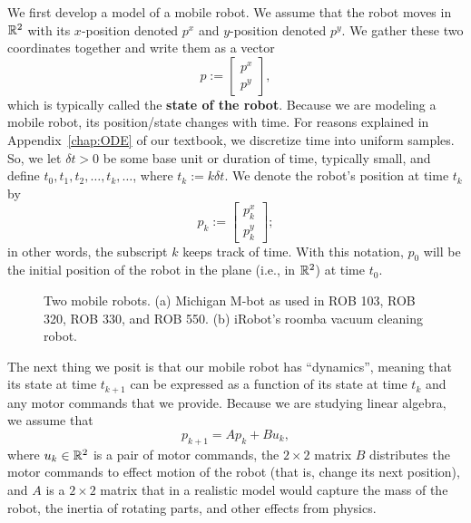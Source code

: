 We first develop a model of a mobile robot. We assume that the robot moves in $\mathbb R^2$ with its $x$-position denoted $p^x$ and $y$-position denoted $p^y$. We gather these two coordinates together and write them as a vector
\begin{equation}
   p:= \begin{bmatrix} p^x \\ p^y \end{bmatrix},
\end{equation}
which is typically called the \textbf{state of the robot}. 
Because we are modeling a mobile robot, its position/state changes with time. For reasons explained in Appendix~\ref{chap:ODE} of our textbook, we discretize time into uniform samples. So, we let $\delta t >0$ be some base unit or duration of time, typically small, and define $t_0, t_1, t_2, \ldots, t_k, \ldots$, where $t_k:=k \delta t$. We denote the robot's position at time $t_k$ by
\begin{equation}
\label{eq:stateVariablesMobileRobot}
   p_k:= \begin{bmatrix} p^x_k \\ p^y_k \end{bmatrix};
\end{equation}
in other words, the subscript $k$ keeps track of time. With this notation, $p_0$ will be the initial position of the robot in the plane (i.e., in $\mathbb R^2$) at time $t_0$. \\

\begin{figure}[htb]%
\centering
{}
\hspace{5pt}%
%
\caption[]{Two mobile robots. (a) Michigan M-bot as used in ROB 103, ROB 320, ROB 330, and ROB 550. (b) iRobot's roomba vacuum cleaning robot.}
    \label{fig:MobileRobots}
\end{figure}


The next thing we posit is that our mobile robot has ``dynamics'', meaning that its state at time $t_{k+1}$ can be expressed as a function of its state at time $t_k$ and any motor commands that we provide. Because we are studying linear algebra, we assume that 
\begin{equation}
\label{eq:DynamicModelMobileRobot}
    p_{k+1} = A p_k + B u_k,
\end{equation}
where $u_k\in \mathbb R^2$ is a pair of motor commands, the $2 \times 2$ matrix $B$ distributes the motor commands to effect motion of the robot (that is, change its next position), and $A$ is a $2 \times 2$ matrix that in a realistic model would capture the mass of the robot, the inertia of rotating parts, and other effects from physics. \\


